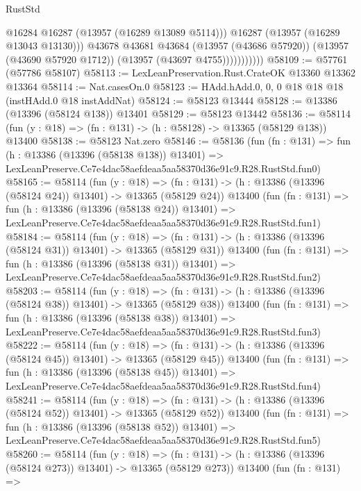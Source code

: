 \begin{lexlean}{RustStd}
\begin{coremodule}
                          @16284
                          @16287
                          (@13957 (@16289 @13089 @5114)))
                        @16287
                        (@13957 (@16289 @13043 @13130)))
                      @43678
                      @43681
                      @43684
                      (@13957 (@43686 @57920))
                      (@13957 (@43690 @57920 @1712))
                      (@13957 (@43697 @4755)))))))))))
@58109 := @57761 (@57786 @58107)
@58113 := LexLeanPreservation.Rust.CrateOK @13360 @13362 @13364
@58114 := Nat.casesOn.{0}
@58123 := HAdd.hAdd.{0, 0, 0} @18 @18 @18 (instHAdd.{0} @18 instAddNat)
@58124 := @58123 @13444
@58128 := @13386 (@13396 (@58124 @138)) @13401
@58129 := @58123 @13442
@58136 := @58114 (fun (y : @18) => (fn : @131) -> (h : @58128) -> @13365 (@58129 @138)) @13400
@58138 := @58123 Nat.zero
@58146 := @58136
    (fun (fn : @131) =>
    fun (h : @13386 (@13396 (@58138 @138)) @13401) =>
    LexLeanPreserve.Ce7e4dac58aefdeaa5aa58370d36e91c9.R28.RustStd.fun0)
@58165 := @58114
    (fun (y : @18) =>
    (fn : @131) -> (h : @13386 (@13396 (@58124 @24)) @13401) -> @13365 (@58129 @24))
    @13400
    (fun (fn : @131) =>
    fun (h : @13386 (@13396 (@58138 @24)) @13401) =>
    LexLeanPreserve.Ce7e4dac58aefdeaa5aa58370d36e91c9.R28.RustStd.fun1)
@58184 := @58114
    (fun (y : @18) =>
    (fn : @131) -> (h : @13386 (@13396 (@58124 @31)) @13401) -> @13365 (@58129 @31))
    @13400
    (fun (fn : @131) =>
    fun (h : @13386 (@13396 (@58138 @31)) @13401) =>
    LexLeanPreserve.Ce7e4dac58aefdeaa5aa58370d36e91c9.R28.RustStd.fun2)
@58203 := @58114
    (fun (y : @18) =>
    (fn : @131) -> (h : @13386 (@13396 (@58124 @38)) @13401) -> @13365 (@58129 @38))
    @13400
    (fun (fn : @131) =>
    fun (h : @13386 (@13396 (@58138 @38)) @13401) =>
    LexLeanPreserve.Ce7e4dac58aefdeaa5aa58370d36e91c9.R28.RustStd.fun3)
@58222 := @58114
    (fun (y : @18) =>
    (fn : @131) -> (h : @13386 (@13396 (@58124 @45)) @13401) -> @13365 (@58129 @45))
    @13400
    (fun (fn : @131) =>
    fun (h : @13386 (@13396 (@58138 @45)) @13401) =>
    LexLeanPreserve.Ce7e4dac58aefdeaa5aa58370d36e91c9.R28.RustStd.fun4)
@58241 := @58114
    (fun (y : @18) =>
    (fn : @131) -> (h : @13386 (@13396 (@58124 @52)) @13401) -> @13365 (@58129 @52))
    @13400
    (fun (fn : @131) =>
    fun (h : @13386 (@13396 (@58138 @52)) @13401) =>
    LexLeanPreserve.Ce7e4dac58aefdeaa5aa58370d36e91c9.R28.RustStd.fun5)
@58260 := @58114
    (fun (y : @18) =>
    (fn : @131) -> (h : @13386 (@13396 (@58124 @273)) @13401) -> @13365 (@58129 @273))
    @13400
    (fun (fn : @131) =>

\end{coremodule}
\end{lexlean}
